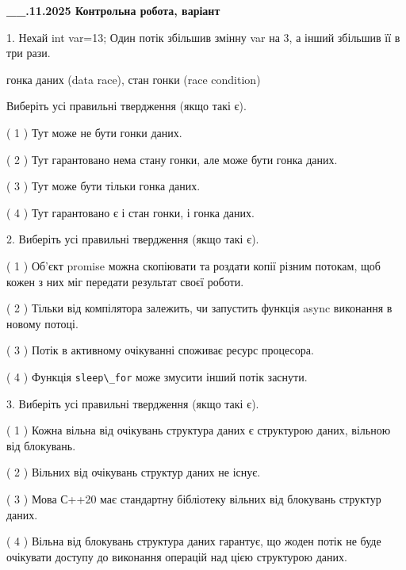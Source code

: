 \documentclass[12pt, ukrainian]{article}
\def\code#1{\Verb!#1!}
\begin{document}
\newpage
\begin {large}

\textbf{\_\_.11.2025 Контрольна робота, варіант  }\par


{
1. Нехай int var=13; Один потік збільшив змінну var на 3, а інший збільшив її в три рази.

гонка даних (data race), стан гонки (race condition)

Виберіть усі правильні твердження (якщо такі є).\par
\vspace{2mm}
( 1 ) Тут може не бути гонки даних.%

( 2 ) Тут гарантовано нема стану гонки, але може бути гонка даних.%

( 3 ) Тут може бути тільки гонка даних.%

( 4 ) Тут гарантовано є і стан гонки, і гонка даних.%


2. Виберіть усі правильні твердження (якщо такі є).\par
\vspace{2mm}

( 1 ) Об’єкт promise можна скопіювати та роздати копії різним потокам, щоб кожен з них міг передати результат своєї роботи.%

( 2 ) Тільки від компілятора залежить, чи запустить функція async виконання в новому потоці.%

( 3 ) Потік в активному очікуванні споживає ресурс процесора.%

( 4 ) Функція \code{sleep\_for} може змусити інший потік заснути.%


3. Виберіть усі правильні твердження (якщо такі є).\par
\vspace{2mm}

( 1 ) Кожна вільна від очікувань структура даних є структурою даних, вільною від блокувань.%

( 2 ) Вільних від очікувань структур даних не існує.%

( 3 ) Мова С++20 має стандартну бібліотеку вільних від блокувань структур даних.%

( 4 ) Вільна від блокувань структура даних гарантує, що жоден потік не буде очікувати доступу до виконання операцій над цією структурою даних.%


}
\end{large}
\end{document}
